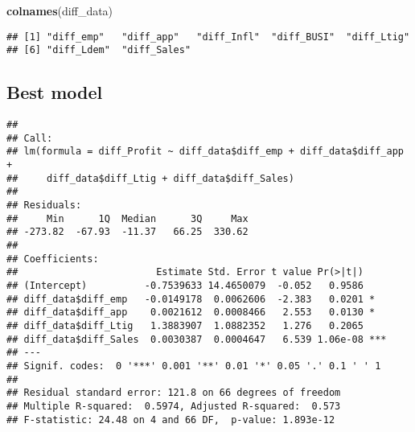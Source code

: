 \documentclass[
]{article}
\newenvironment{Shaded}{\begin{snugshade}}{\end{snugshade}}
\newcommand{\FunctionTok}[1]{\textcolor[rgb]{0.13,0.29,0.53}{\textbf{#1}}}
\newcommand{\NormalTok}[1]{#1}
\newcommand{\OtherTok}[1]{\textcolor[rgb]{0.56,0.35,0.01}{#1}}
\newcommand{\SpecialCharTok}[1]{\textcolor[rgb]{0.81,0.36,0.00}{\textbf{#1}}}
\begin{document}
\begin{Shaded}
\begin{Highlighting}[]
\FunctionTok{colnames}\NormalTok{(diff\_data)}
\end{Highlighting}
\end{Shaded}

\begin{verbatim}
## [1] "diff_emp"   "diff_app"   "diff_Infl"  "diff_BUSI"  "diff_Ltig" 
## [6] "diff_Ldem"  "diff_Sales"
\end{verbatim}

\subsection{Best model}\label{best-model}

\begin{Shaded}
\end{Shaded}

\begin{verbatim}
## 
## Call:
## lm(formula = diff_Profit ~ diff_data$diff_emp + diff_data$diff_app + 
##     diff_data$diff_Ltig + diff_data$diff_Sales)
## 
## Residuals:
##     Min      1Q  Median      3Q     Max 
## -273.82  -67.93  -11.37   66.25  330.62 
## 
## Coefficients:
##                        Estimate Std. Error t value Pr(>|t|)    
## (Intercept)          -0.7539633 14.4650079  -0.052   0.9586    
## diff_data$diff_emp   -0.0149178  0.0062606  -2.383   0.0201 *  
## diff_data$diff_app    0.0021612  0.0008466   2.553   0.0130 *  
## diff_data$diff_Ltig   1.3883907  1.0882352   1.276   0.2065    
## diff_data$diff_Sales  0.0030387  0.0004647   6.539 1.06e-08 ***
## ---
## Signif. codes:  0 '***' 0.001 '**' 0.01 '*' 0.05 '.' 0.1 ' ' 1
## 
## Residual standard error: 121.8 on 66 degrees of freedom
## Multiple R-squared:  0.5974, Adjusted R-squared:  0.573 
## F-statistic: 24.48 on 4 and 66 DF,  p-value: 1.893e-12
\end{verbatim}
\end{document}
